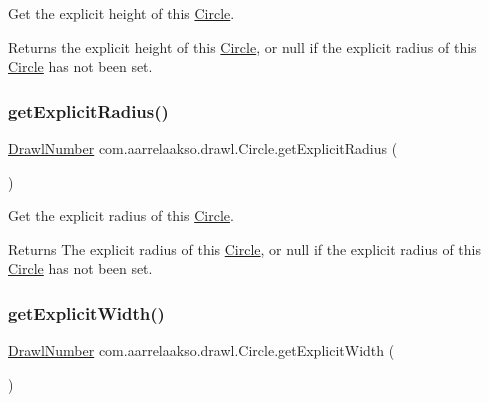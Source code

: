Get the explicit height of this \hyperlink{classcom_1_1aarrelaakso_1_1drawl_1_1_circle}{Circle}. 

\begin{DoxyReturn}{Returns}
the explicit height of this \hyperlink{classcom_1_1aarrelaakso_1_1drawl_1_1_circle}{Circle}, or {\ttfamily null} if the explicit radius of this \hyperlink{classcom_1_1aarrelaakso_1_1drawl_1_1_circle}{Circle} has not been set. 
\end{DoxyReturn}
\mbox{\label{classcom_1_1aarrelaakso_1_1drawl_1_1_circle_a86dad8314ef32e7561087b43cfcba25a}} 
\subsubsection{\texorpdfstring{get\+Explicit\+Radius()}{getExplicitRadius()}}
{\footnotesize\ttfamily \hyperlink{classcom_1_1aarrelaakso_1_1drawl_1_1_drawl_number}{Drawl\+Number} com.\+aarrelaakso.\+drawl.\+Circle.\+get\+Explicit\+Radius (\begin{DoxyParamCaption}{ }\end{DoxyParamCaption})\hspace{0.3cm}{\ttfamily [protected]}}



Get the explicit radius of this \hyperlink{classcom_1_1aarrelaakso_1_1drawl_1_1_circle}{Circle}. 

\begin{DoxyReturn}{Returns}
The explicit radius of this \hyperlink{classcom_1_1aarrelaakso_1_1drawl_1_1_circle}{Circle}, or {\ttfamily null} if the explicit radius of this \hyperlink{classcom_1_1aarrelaakso_1_1drawl_1_1_circle}{Circle} has not been set. 
\end{DoxyReturn}
\mbox{\label{classcom_1_1aarrelaakso_1_1drawl_1_1_circle_af02bae455881ed2a1570366a2b63c90b}} 
\subsubsection{\texorpdfstring{get\+Explicit\+Width()}{getExplicitWidth()}}
{\footnotesize\ttfamily \hyperlink{classcom_1_1aarrelaakso_1_1drawl_1_1_drawl_number}{Drawl\+Number} com.\+aarrelaakso.\+drawl.\+Circle.\+get\+Explicit\+Width (\begin{DoxyParamCaption}{ }\end{DoxyParamCaption})\hspace{0.3cm}{\ttfamily [protected]}}



